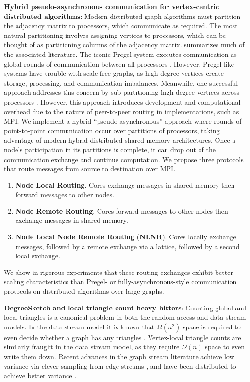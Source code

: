 \documentclass{report}
\begin{document}
\noindent
\textbf{Hybrid pseudo-asynchronous communication for vertex-centric distributed algorithms}:
Modern distributed graph algorithms must partition the adjacency matrix to processors, which communicate as required. 
The most natural partitioning involves assigning vertices to processors, which can be thought of as partitioning columns of the adjacency matrix.
\cite{mccune2015thinking} summarizes much of the associated literature.
The iconic Pregel system executes communication as global rounds of communication between all processors \cite{malewicz2010pregel}.
However, Pregel-like systems have trouble with scale-free graphs, as high-degree vertices create storage, processing, and communication imbalances.
Meanwhile, one successful approach addresses this concern by sub-partitioning high-degree vertices across processors \cite{pearce2014faster}.
However, this approach introduces development and computational overhead due to the nature of peer-to-peer routing in implementations, such as MPI.
We implement a hybrid ``pseudo-asynchronous'' approach where rounds of point-to-point communication occur over partitions of processors, taking advantage of modern hybrid distributed-shared memory architectures.
Once a node's participation in its partitions is complete, it can drop out of the communication exchange and continue computation.
We propose three protocols that route messages from source to destination over MPI. 
%
\begin{enumerate}
	\item \textbf{Node Local Routing}. Cores exchange messages in shared memory then forward messages to other nodes.
	\item \textbf{Node Remote Routing}. Cores forward messages to other nodes then exchange messages in shared memory.
	\item \textbf{Node Local Node Remote Routing} (\textbf{NLNR}). Cores locally exchange messages, followed by a remote exchange via a lattice, followed by a second local exchange. 
\end{enumerate}
%
We show in rigorous experiments that these routing exchanges exhibit better scaling characteristics than Pregel- or fully-asynchronous-style communication protocols on distributed algorithms over large graphs.

\noindent
\textbf{DegreeSketch and local triangle count heavy hitters}:
Counting global and local triangles is a canonical problem in both the random access and data stream models. 
In the data stream model it is known that $\Omega(n^2)$ space is required to even decide whether a graph has any triangles \cite{bar2002reductions}.
Vertex-local triangle counts are similarly fraught in the data stream model, as they require $\Omega(n)$ space to even write them down. 
Recent advances in the graph stream literature achieve low variance via clever sampling from edge streams \cite{becchetti2008efficient, lim2015mascot, stefani2017triest}, and have been distributed to achieve better variance \cite{shin2018tri, shin2018dislr}.
\end{document}
